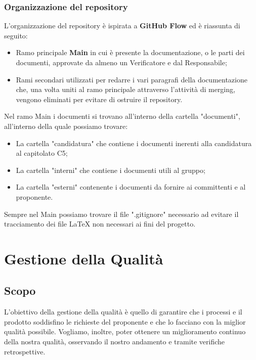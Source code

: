   \subsubsection{Organizzazione del repository}
  L'organizzazione del repository è ispirata a \textbf{GitHub Flow} ed è riassunta di seguito:
  \begin{itemize}
      \item Ramo principale \textbf{Main} in cui è presente la documentazione, o le parti dei documenti, approvate da almeno un Verificatore e dal Responsabile;
      \item Rami secondari utilizzati per redarre i vari paragrafi della documentazione che, una volta uniti al ramo principale attraverso l'attività di merging, vengono eliminati per evitare di ostruire il repository.
  \end{itemize}
  Nel ramo Main i documenti si trovano all'interno della cartella "documenti", all'interno della quale possiamo trovare:
  \begin{itemize}
      \item La cartella "candidatura" che contiene i documenti inerenti alla candidatura al capitolato C5;
      \item La cartella "interni" che contiene i documenti utili al gruppo;
      \item La cartella "esterni" contenente i documenti da fornire ai committenti e al proponente.
  \end{itemize}
  Sempre nel Main possiamo trovare il file ".gitignore" necessario ad evitare il tracciamento dei file \LaTeX{} non necessari ai fini del progetto.


\section{Gestione della Qualità}
  \subsection{Scopo}
  L'obiettivo della gestione della qualità è quello di garantire
  che i processi e il prodotto soddisfino le richieste del proponente
  e che lo facciano con la miglior qualità possibile.
  \newline
  Vogliamo, inoltre, poter ottenere un miglioramento continuo della nostra
  qualità, osservando il nostro andamento e tramite verifiche retrospettive.

